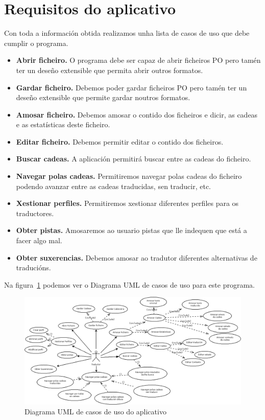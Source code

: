 \section{Requisitos do aplicativo}
Con toda a información obtida realizamos unha lista de casos de uso que debe cumplir o programa.

\begin{itemize}
  \item \textbf{Abrir ficheiro.} O programa debe ser capaz de abrir ficheiros PO pero tamén ter un deseño extensible que permita abrir outros formatos.
  \item \textbf{Gardar ficheiro.} Debemos poder gardar ficheiros PO pero tamén ter un deseño extensible que permite gardar noutros formatos.
  \item \textbf{Amosar ficheiro.} Debemos amosar o contido dos ficheiros e dicir, as cadeas e as estatísticas deste ficheiro.
  \item \textbf{Editar ficheiro.} Debemos permitir editar o contido dos ficheiros.
  \item \textbf{Buscar cadeas.} A aplicación permitirá buscar entre as cadeas do ficheiro.
  \item \textbf{Navegar polas cadeas.} Permitiremos navegar polas cadeas do ficheiro podendo avanzar entre as cadeas traducidas, sen traducir, etc.
  \item \textbf{Xestionar perfiles.} Permitiremos xestionar diferentes perfiles para os traductores.
  \item \textbf{Obter pistas.} Amosaremos ao usuario pistas que lle indequen que está a facer algo mal.
  \item \textbf{Obter suxerencias.} Debemos amosar ao tradutor diferentes alternativas de traducións.
\end{itemize}

Na figura~\ref{fig:casosdeuso} podemos ver o Diagrama UML de casos de uso para este programa.

\begin{figure}[h!]
    \centering
    \includegraphics[width=0.9\textheight,angle=90]{img/casosdeuso.png}
    \caption{Diagrama UML de casos de uso do aplicativo}
    \label{fig:casosdeuso}
\end{figure}

%
%
